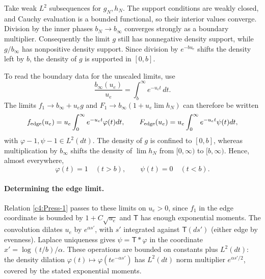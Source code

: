 Take weak \(L^2\) subsequences for \(g_N,h_N\). The support conditions
are weakly closed, and Cauchy evaluation is a bounded functional, so their
interior values converge. Division by the inner phases
\(b_N\to b_\infty\) converges strongly as a boundary multiplier.
Consequently the limit \(g\) still has nonnegative density support,
while \(g/b_\infty\) has nonpositive density support. Since division by
\(e^{-bu_e}\) shifts the density left by \(b\), the density of \(g\)
is supported in \([0,b]\).

To read the boundary data for the unscaled limits, use
\[
             \frac{b_\infty(u_e)}{u_e}
                    =\int_b^\infty e^{-u_e t}\,dt.
\]
The limits \(f_1\to b_\infty+u_e g\) and
\(F_1\to b_\infty(1+u_e\lim h_N)\) can therefore be written
\[
 f_{\rm edge}(u_e)=u_e\int_0^\infty e^{-u_e t}\varphi(t)dt,\qquad
 F_{\rm edge}(u_e)=u_e\int_0^\infty e^{-u_e t}\psi(t)dt ,
\]
with \(\varphi-1,\psi-1\in L^2(dt)\). The density of \(g\) is confined
to \([0,b]\), whereas multiplication by \(b_\infty\) shifts the density
of \(\lim h_N\) from \([0,\infty)\) to \([b,\infty)\). Hence, almost
everywhere,
\[
                 \varphi(t)=1\quad(t>b),\qquad
                 \psi(t)=0\quad(t<b).
\]

\paragraph{Determining the edge limit.}
Relation \eqref{c4:Press-1} passes to these limits on \(u_e>0\), since
\(f_1\) in the edge coordinate is bounded by \(1+C\sqrt{u_e}\) and
\(\mathsf T\) has enough exponential moments. The convolution dilates
\(u_e\) by \(e^{\alpha s'}\), with \(s'\) integrated against
\(\mathsf T(ds')\) (either edge by evenness). Laplace uniqueness gives
\(\psi=\mathsf T*\varphi\) in the coordinate
\(x'=\log(t/b)/\alpha\). These operations are bounded on constants plus
\(L^2(dt)\): the density dilation
\(\varphi(t)\mapsto\varphi(te^{-\alpha s'})\) has \(L^2(dt)\) norm
multiplier \(e^{\alpha s'/2}\), covered by the stated exponential moments.

